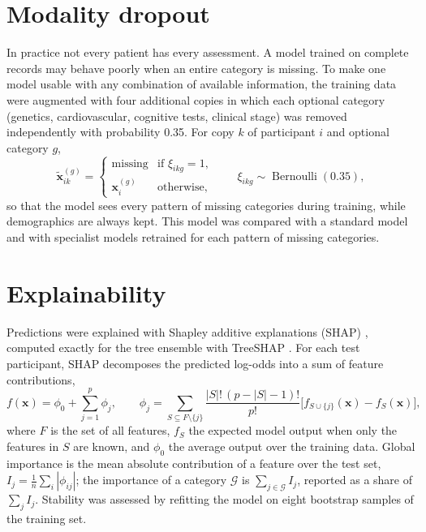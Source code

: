 \section{Modality dropout}

In practice not every patient has every assessment. A model trained on complete records may behave poorly when an entire category is missing. To make one model usable with any combination of available information, the training data were augmented with four additional copies in which each optional category (genetics, cardiovascular, cognitive tests, clinical stage) was removed independently with probability 0.35. For copy $k$ of participant $i$ and optional category $g$,
\begin{equation}
\tilde{\mathbf{x}}^{(g)}_{ik} = \begin{cases} \text{missing} & \text{if } \xi_{ikg} = 1, \\ \mathbf{x}^{(g)}_i & \text{otherwise}, \end{cases} \qquad \xi_{ikg} \sim \operatorname{Bernoulli}(0.35),
\end{equation}
so that the model sees every pattern of missing categories during training, while demographics are always kept. This model was compared with a standard model and with specialist models retrained for each pattern of missing categories.

\section{Explainability}

Predictions were explained with Shapley additive explanations (SHAP) \cite{lundberg2017}, computed exactly for the tree ensemble with TreeSHAP \cite{lundberg2020}. For each test participant, SHAP decomposes the predicted log-odds into a sum of feature contributions,
\begin{equation}
f(\mathbf{x}) = \phi_0 + \sum_{j=1}^{p} \phi_j, \qquad
\phi_j = \sum_{S \subseteq F \setminus \{j\}} \frac{|S|!\,(p - |S| - 1)!}{p!} \Big[ f_{S \cup \{j\}}(\mathbf{x}) - f_S(\mathbf{x}) \Big],
\end{equation}
where $F$ is the set of all features, $f_S$ the expected model output when only the features in $S$ are known, and $\phi_0$ the average output over the training data. Global importance is the mean absolute contribution of a feature over the test set, $I_j = \frac{1}{n}\sum_i |\phi_{ij}|$; the importance of a category $\mathcal{G}$ is $\sum_{j \in \mathcal{G}} I_j$, reported as a share of $\sum_j I_j$. Stability was assessed by refitting the model on eight bootstrap samples of the training set.

